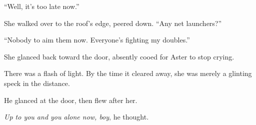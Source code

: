 ``Well, it's too late now.''



She walked over to the roof's edge, peered down.  ``Any net launchers?''



``Nobody to aim them now.  Everyone's fighting my doubles.''



She glanced back toward the door, absently cooed for Aster to stop crying.



There was a flash of light.  By the time it cleared away, she was merely a glinting speck in the distance.



He glanced at the door, then flew after her.



\emph{Up to you and you alone now, boy}, he thought.





